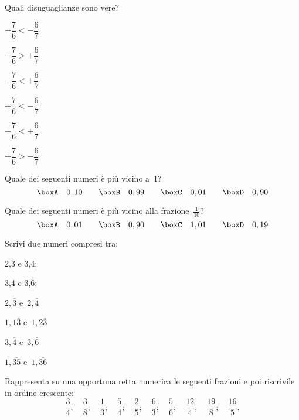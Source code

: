 \begin{esercizio}
\label{ese:3.39}
Quali disuguaglianze sono vere?
\begin{multicols}{2}
\TabPositions{2.5cm}
\begin{enumeratea}
\spazielenx
 \item \(-\dfrac{7}{6}<-\dfrac{6}{7}\)\tab\boxV\qquad\boxF
 \item \(-\dfrac{7}{6}>+\dfrac{6}{7}\)\tab\boxV\qquad\boxF
 \item \(-\dfrac{7}{6}<+\dfrac{6}{7}\)\tab\boxV\qquad\boxF
 \item \(+\dfrac{7}{6}<-\dfrac{6}{7}\)\tab\boxV\qquad\boxF
 \item \(+\dfrac{7}{6}<+\dfrac{6}{7}\)\tab\boxV\qquad\boxF
 \item \(+\dfrac{7}{6}>-\dfrac{6}{7}\)\tab\boxV\qquad\boxF
 \end{enumeratea}
\end{multicols}
\end{esercizio}

\begin{esercizio}
\label{ese:3.40}
Quale dei seguenti numeri è più vicino a~1?
\[\boxA\quad0,10\qquad\boxB\quad0,99\qquad\boxC\quad0,01\qquad\boxD\quad0,90\]
\end{esercizio}

 \begin{esercizio}
\label{ese:3.41}
Quale dei seguenti numeri è più vicino alla frazione~\(\frac{1}{10}\)?
\[\boxA\quad0,01\qquad\boxB\quad0,90\qquad\boxC\quad1,01\qquad\boxD\quad0,19\]
 \end{esercizio}

\begin{esercizio}
\label{ese:3.42}
Scrivi due numeri compresi tra:
\begin{multicols}{3}
\begin{enumeratea}
 \item 2,3 e 3,4;
 \item 3,4 e 3,6;
 \item \(2,\overline{3}\) e~\(2,\overline{4}\)
 \item \(1,1\overline{3}\) e~\(1,2\overline{3}\)
 \item \(3,\overline{4}\) e~\(3,\overline{6}\)
 \item \(1,\overline{35}\) e~\(1,\overline{36}\)
\end{enumeratea}
\end{multicols}
\end{esercizio}

\begin{esercizio}
 \label{ese:3.43}
Rappresenta su una opportuna retta numerica le seguenti frazioni e poi 
riscrivile in ordine crescente:
\[\frac{3}{4}; \quad \frac{3}{8}; \quad \frac{1}{3}; \quad \frac{5}{4}; 
\quad \frac{2}{5}; \quad \frac{6}{3}; \quad \frac{5}{6}; 
\quad \frac{12}{4}; \quad \frac{19}{8}; \quad \frac{16}{5}.\]
\end{esercizio}

